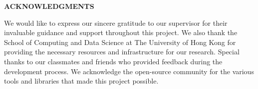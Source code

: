 \begin{center}
    \vspace*{2cm}
    {\Large \textbf{ACKNOWLEDGMENTS}}\\[1cm]
\end{center}

We would like to express our sincere gratitude to our supervisor for their invaluable guidance and support throughout this project. We also thank the School of Computing and Data Science at The University of Hong Kong for providing the necessary resources and infrastructure for our research. Special thanks to our classmates and friends who provided feedback during the development process. We acknowledge the open-source community for the various tools and libraries that made this project possible.

\newpage 